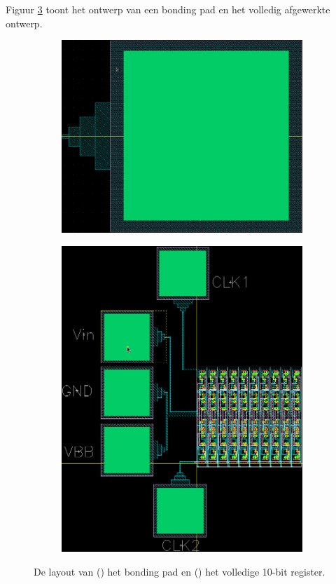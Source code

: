 \documentclass[11pt,a4paper,oneside,dutch]{article}
\begin{document}
Figuur \ref{fig:layout} toont het ontwerp van een bonding pad en het volledig afgewerkte ontwerp.

\begin{figure}
	\centering
	\begin{subfigure}[b]{0.5\textwidth}
		\includegraphics[width=\textwidth]{bonding_pad.png}
		\caption{}
		\label{fig:bonding_pad}
	\end{subfigure}
	\qquad
	\begin{subfigure}[b]{0.4\textwidth}
		\includegraphics[width=\textwidth]{10bit.png}
		\caption{}
		\label{fig:10bit}
	\end{subfigure}
	
	\caption{De layout van () het bonding pad en () het volledige 10-bit register.}
	\label{fig:layout}
\end{figure}
\end{document}
